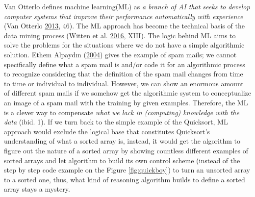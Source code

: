 \documentclass[12pt,twoside]{report}
\begin{document}
Van Otterlo defines machine learning(ML) as \emph{a branch of AI that seeks to develop computer systems that improve their performance automatically with experience} (Van Otterlo \protect\hyperlink{ref-Otterlo2013}{2013}, 46). The ML approach has become the technical basis of the data mining process (Witten et al. \protect\hyperlink{ref-Witten2016}{2016}, XIII). The logic behind ML aims to solve the problems for the situations where we do not have a simple algorithmic solution. Ethem Alpaydın (\protect\hyperlink{ref-Alpaydin2004}{2004}) gives the example of spam mails; we cannot specifically define what a spam mail is and/or code it for an algorithmic process to recognize considering that the definition of the spam mail changes from time to time or individual to individual. However, we can show an enormous amount of different spam mails if we somehow get the algorithmic system to conceptualize an image of a spam mail with the training by given examples. Therefore, the ML is a clever way to compensate \emph{what we lack in (computing) knowledge with the data} (ibid. 1). If we turn back to the simple example of the Quicksort, ML approach would exclude the logical base that constitutes Quicksort's understanding of what a sorted array is, instead, it would get the algorithm to figure out the nature of a sorted array by showing countless different examples of sorted arrays and let algorithm to build its own control scheme (instead of the step by step code example on the Figure \ref{fig:quickboy}) to turn an unsorted array to a sorted one, thus, what kind of reasoning algorithm builds to define a sorted array stays a mystery.
\end{document}
